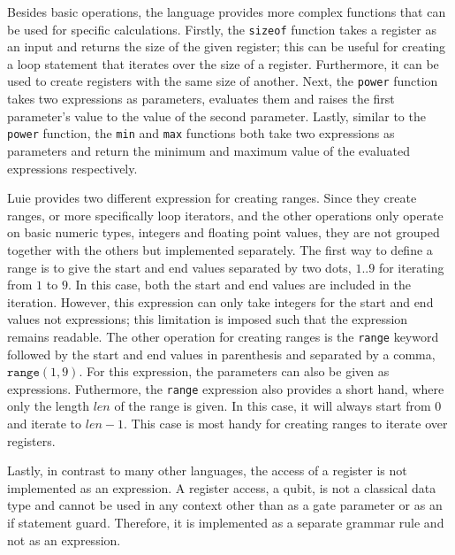 Besides basic operations, the language provides more complex functions that can be used for specific calculations. Firstly, the \texttt{sizeof} function takes a register as an input and returns the size of the given register; this can be useful for creating a loop statement that iterates over the size of a register. Furthermore, it can be used to create registers with the same size of another. Next, the \texttt{power} function takes two expressions as parameters, evaluates them and raises the first parameter's value to the value of the second parameter. Lastly, similar to the \texttt{power} function, the \texttt{min} and \texttt{max} functions both take two expressions as parameters and return the minimum and maximum value of the evaluated expressions respectively.    

Luie provides two different expression for creating ranges. Since they create ranges, or more specifically loop iterators, and the other operations only operate on basic numeric types, \eg integers and floating point values, they are not grouped together with the others but implemented separately. The first way to define a range is to give the start and end values separated by two dots, \eg $1\texttt{..}9$ for iterating from $1$ to $9$. In this case, both the start and end values are included in the iteration. However, this expression can only take integers for the start and end values not expressions; this limitation is imposed such that the expression remains readable. The other operation for creating ranges is the \texttt{range} keyword followed by the start and end values in parenthesis and separated by a comma, \eg $\texttt{range}(1, 9)$. For this expression, the parameters can also be given as expressions. Futhermore, the \texttt{range} expression also provides a short hand, where only the length $len$ of the range is given. In this case, it will always start from $0$ and iterate to $len - 1$. This case is most handy for creating ranges to iterate over registers. 

Lastly, in contrast to many other languages, the access of a register is not implemented as an expression. A register access, \ie a qubit, is not a classical data type and cannot be used in any context other than as a gate parameter or as an if statement guard. Therefore, it is implemented as a separate grammar rule and not as an expression.

